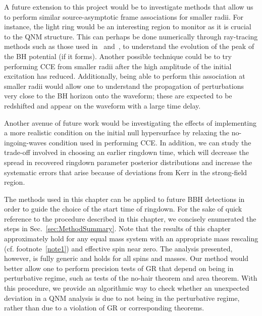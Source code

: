 A future extension to this project would be to investigate methods that allow us to perform similar source-asymptotic frame associations for smaller radii. For instance, the light ring would be an interesting region to monitor as it is crucial to the QNM structure. This can perhaps be done numerically through ray-tracing methods such as those used in~\cite{Bohn:2016afc} and~\cite{Bohn:2014xxa}, to understand the evolution of the peak of the BH potential (if it forms).  Another possible technique could be to try performing CCE from smaller radii after the high amplitude of the initial excitation has reduced. Additionally, being able to perform this association at smaller radii would allow one to understand the propagation of perturbations very close to the BH horizon onto the waveform; these are expected to be redshifted and appear on the waveform with a large time delay. 

Another avenue of future work would be investigating the effects of implementing a more realistic condition on the initial null hypersurface by relaxing the no-ingoing-waves condition used in performing CCE.  In addition, we can study the trade-off involved in choosing an earlier ringdown time, which will decrease the spread in recovered ringdown parameter posterior distributions and increase the systematic errors that arise because of deviations from Kerr in the strong-field region. %

The methods used in this chapter can be applied to future BBH detections in order to guide the choice of the start time of ringdown. For the sake of quick reference to the procedure described in this chapter, we concisely enumerated the steps in Sec.~\ref{sec:MethodSummary}. Note that the results of this chapter approximately hold for any equal mass system with an appropriate mass rescaling (cf. footnote~\ref{note1}) and effective spin near zero. The analysis presented, however, is fully generic and holds for all spins and masses. Our method would better allow one to perform precision tests of GR that depend on being in perturbative regime, such as tests of the no-hair theorem and area theorem. With this procedure, we provide an algorithmic way to check whether an unexpected deviation in a QNM analysis is due to not being in the perturbative regime, rather than due to a violation of GR or corresponding theorems. 

